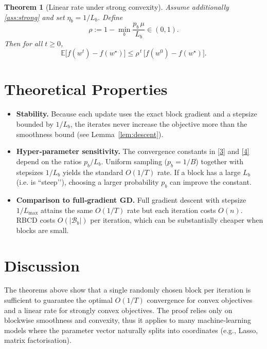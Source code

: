 \documentclass[11pt]{article}
\newtheorem{theorem}{Theorem}
\newcommand{\E}{\mathbb{E}}
\begin{document}
\begin{theorem}[Linear rate under strong convexity]\label{thm:strong}
Assume additionally \ref{ass:strong} and set
$\eta_{b}=1/L_{b}$.  Define
\[
\rho:=1-\min_{b}\frac{p_{b}\,\mu}{L_{b}}\in(0,1).
\]
Then for all $t\ge 0$,
\[
\E\!\bigl[f(w^{t})-f(w^{\star})\bigr]\le
\rho^{\,t}\,\bigl[f(w^{0})-f(w^{\star})\bigr].
\tag{4}
\]
\end{theorem}

\section*{Theoretical Properties}
\begin{itemize}[leftmargin=*]
\item \textbf{Stability.}  Because each update uses the exact block gradient
and a stepsize bounded by $1/L_{b}$, the iterates never increase the
objective more than the smoothness bound (see Lemma~\ref{lem:descent}).
\item \textbf{Hyper‑parameter sensitivity.}  The convergence constants in
\eqref{3} and \eqref{4} depend on the ratios $p_{b}/L_{b}$.  Uniform
sampling ($p_{b}=1/B$) together with stepsizes $1/L_{b}$ yields the
standard $O(1/T)$ rate.  If a block has a large $L_{b}$ (i.e. is “steep’’),
choosing a larger probability $p_{b}$ can improve the constant.
\item \textbf{Comparison to full‑gradient GD.}  Full gradient descent with
stepsize $1/L_{\max}$ attains the same $O(1/T)$ rate but each iteration
costs $O(n)$.  RBCD costs $O(|\mathcal{B}_{b}|)$ per iteration, which can be
substantially cheaper when blocks are small.
\end{itemize}

\section*{Discussion}
The theorems above show that a single randomly chosen block per iteration
is sufficient to guarantee the optimal $O(1/T)$ convergence for convex
objectives and a linear rate for strongly convex objectives.  The proof
relies only on blockwise smoothness and convexity, thus it applies to
many machine‑learning models where the parameter vector naturally splits
into coordinates (e.g., Lasso, matrix factorisation).

\newpage
\end{document}
